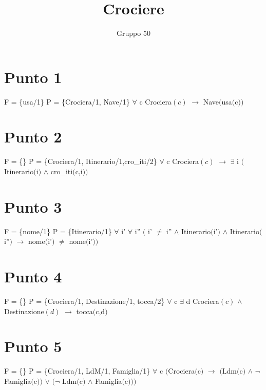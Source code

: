 \documentclass{article}
\begin{document}
\title{Crociere}
\author{Gruppo 50}
\date{}

\maketitle

\section{Punto 1}
F = \{usa/1\}
\newline
P = \{Crociera/1, Nave/1\}
\newline
$\forall$ c Crociera$(c)$ $\rightarrow$ Nave$($usa$($c$)$$)$
\section{Punto 2}
F = \{\}
\newline
P = \{Crociera/1, Itinerario/1,cro\_iti/2\}
\newline
$\forall$ c Crociera$(c)$ $\rightarrow$ $\exists$ i $($Itinerario$($i$)$ $\land$ cro\_iti$($c,i$)$$)$
\section{Punto 3}
F = \{nome/1\}
\newline
P = \{Itinerario/1\}
\newline
$\forall$ i' $\forall$ i'' $($ i' $\neq$ i'' $\land$ Itinerario$($i'$)$ $\land$ Itinerario$($i''$)$ $\rightarrow$ nome$($i'$)$ $\neq$ nome$($i'$)$$)$
\section{Punto 4}
F = \{\}
\newline
P = \{Crociera/1, Destinazione/1, tocca/2\}
\newline
$\forall$ c $\exists$ d Crociera$(c)$ $\land$ Destinazione$(d)$ $\rightarrow$ tocca$($c,d$)$
\section{Punto 5}
F = \{\}
\newline
P = \{Crociera/1, LdM/1, Famiglia/1\}
\newline
$\forall$ c $($Crociera$($c$)$ $\rightarrow$ $($Ldm$($c$)$ $\land$ $\neg$ Famiglia$($c$)$$)$ $\lor$ $($$\neg$ Ldm$($c$)$ $\land$ Famiglia$($c$)$$)$$)$
\end{document}
